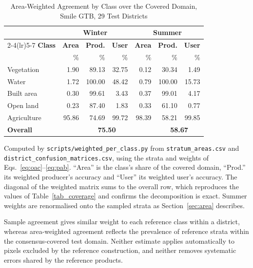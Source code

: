 \documentclass[conference]{IEEEtran}
\begin{document}
\begin{table}[!htbp]
\caption{Area-Weighted Agreement by Class over the Covered Domain, Smile GTB, 29 Test Districts}
\label{tab_weighted_class}
\begin{center}
\setlength{\tabcolsep}{3.5pt}
\footnotesize
\begin{tabular}{@{}lrrrrrr@{}}
\toprule
 & \multicolumn{3}{c}{\textbf{Winter}} & \multicolumn{3}{c}{\textbf{Summer}} \\
\cmidrule(lr){2-4}\cmidrule(lr){5-7}
\textbf{Class} & \textbf{Area} & \textbf{Prod.} & \textbf{User} & \textbf{Area} & \textbf{Prod.} & \textbf{User} \\
 & \% & \% & \% & \% & \% & \% \\
\midrule
Vegetation  &  1.90 &  89.13 & 32.75 &  0.12 &  30.34 &  1.49 \\
Water       &  1.72 & 100.00 & 48.42 &  0.79 & 100.00 & 15.73 \\
Built area  &  0.30 &  99.61 &  3.43 &  0.37 &  99.01 &  4.17 \\
Open land   &  0.23 &  87.40 &  1.83 &  0.33 &  61.10 &  0.77 \\
Agriculture & 95.86 &  74.69 & 99.72 & 98.39 &  58.21 & 99.85 \\
\midrule
\textbf{Overall} & & \multicolumn{2}{c}{\textbf{75.50}} & & \multicolumn{2}{c}{\textbf{58.67}} \\
\bottomrule
\end{tabular}

\vspace{2pt}
\parbox{\columnwidth}{\footnotesize Computed by \texttt{scripts/weighted\_per\_class.py} from \texttt{stratum\_areas.csv} and \texttt{district\_confusion\_matrices.csv}, using the strata and weights of Eqs.~\eqref{eq:oac}--\eqref{eq:pab}. ``Area'' is the class's share of the covered domain, ``Prod.'' its weighted producer's accuracy and ``User'' its weighted user's accuracy. The diagonal of the weighted matrix sums to the overall row, which reproduces the values of Table~\ref{tab_coverage} and confirms the decomposition is exact. Summer weights are renormalised onto the sampled strata as Section~\ref{sec:area} describes.}
\end{center}
\end{table} Sample agreement gives similar weight to each reference class within a district, whereas area-weighted agreement reflects the prevalence of reference strata within the consensus-covered test domain. Neither estimate applies automatically to pixels excluded by the reference construction, and neither removes systematic errors shared by the reference products.
\end{document}
